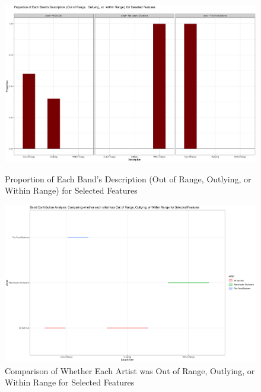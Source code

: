 \documentclass{article}\usepackage[]{graphicx}\usepackage[]{xcolor}
\begin{document}
\begin{figure}[!htbp]
    \centering
    \includegraphics[width=1.05\textwidth, trim=0 0 0 50, clip]{bar.png}
    \caption{Proportion of Each Band's Description  (Out of Range,  Outlying,  or  Within Range)  for Selected Features}
    \vspace{0.20cm} 
    \includegraphics[width=1.05\textwidth, trim=0 0 0 50, clip]{Plot.png}
    \caption{Comparison of Whether Each Artist was Out of Range, Outlying, or Within Range for Selected Features}
\end{figure}
\end{document}
